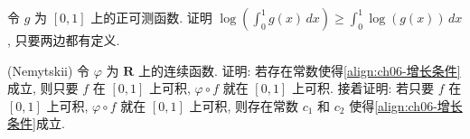 \documentclass[../../main.tex]{subfiles}
\begin{document}
\begin{exercise}\label{exercise:ch06-70}
令 $g$ 为 $[0,1]$ 上的正可测函数. 证明 $\log\left(\int_{0}^{1}g(x)\,dx\right)\geqslant\int_{0}^{1}\log(g(x))\,dx$, 只要两边都有定义.
\end{exercise}

\begin{exercise}\label{exercise:ch06-71}
(Nemytskii) 令 $\varphi$ 为 $\mathbf{R}$ 上的连续函数. 证明: 若存在常数使得\eqref{align:ch06-增长条件}成立, 则只要 $f$ 在 $[0,1]$ 上可积, $\varphi\circ f$ 就在 $[0,1]$ 上可积. 接着证明: 若只要 $f$ 在 $[0,1]$ 上可积, $\varphi\circ f$ 就在 $[0,1]$ 上可积, 则存在常数 $c_{1}$ 和 $c_{2}$ 使得\eqref{align:ch06-增长条件}成立.
\end{exercise}
\end{document}
